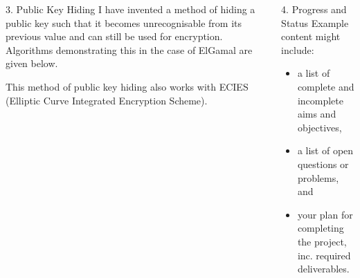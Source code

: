 \documentclass[ %
                    author={Luke Murray},
                supervisor={Dr. Simon Hollis},
                     title={Shadow Peer-to-Peer Networks},
                  subtitle={},
                    degree={MEng},
                      year={2013} ]{poster}
\begin{document}
\begin{frame}{}
\begin{columns}[t]
\begin{column}{0.422\linewidth}
\begin{block}{\normalsize 3. Public Key Hiding}
    I have invented a method of hiding a public key such that it becomes unrecognisable from its previous value and can still be used for encryption. Algorithms demonstrating this in the case of ElGamal are given below.
    
    
    This method of public key hiding also works with ECIES (Elliptic Curve Integrated Encryption Scheme).

    \end{block}
    \end{column}
    \begin{column}{0.422\linewidth}
    \begin{block}{\normalsize 4. Progress and Status}
    Example content might include:

    \begin{itemize}
    \item a list of complete and incomplete aims and objectives,
    \item a list of open questions or problems,
        and
    \item your plan for completing the project, inc. required deliverables.
    \end{itemize}
    \end{block}
    \end{column}
\end{columns}

\vfill

\end{frame}

\end{document}
